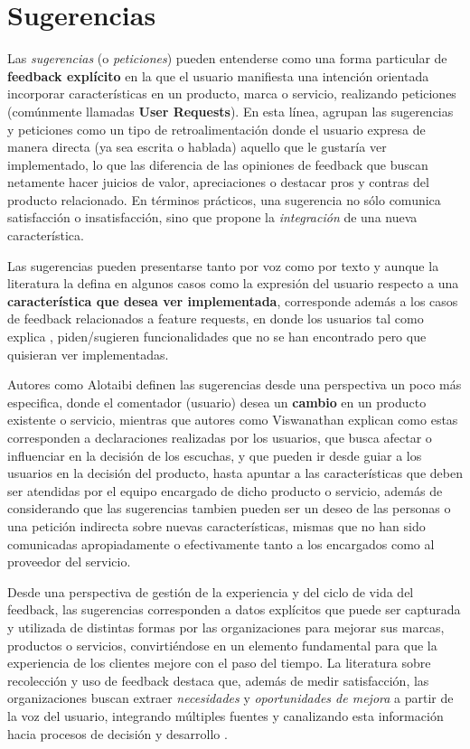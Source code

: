 \section{Sugerencias}
\label{sec:sugerencias}

Las \emph{sugerencias} (o \emph{peticiones}) pueden entenderse como una forma particular de \textbf{feedback explícito} en la que el usuario manifiesta una intención orientada incorporar características en un producto, marca o servicio, realizando peticiones (comúnmente llamadas \textbf{User Requests}). En esta línea, \textcite{tkalich2025user} agrupan las sugerencias y peticiones como un tipo de retroalimentación donde el usuario expresa de manera directa (ya sea escrita o hablada) aquello que le gustaría ver implementado, lo que las diferencia de las opiniones de feedback que buscan netamente hacer juicios de valor, apreciaciones o destacar pros y contras del producto relacionado. En términos prácticos, una sugerencia no sólo comunica satisfacción o insatisfacción, sino que propone la \emph{integración} de una nueva característica.

Las sugerencias pueden presentarse tanto por voz como por texto y aunque la literatura la defina en algunos casos como la expresión del usuario respecto a una \textbf{característica que desea ver implementada}, corresponde además a los casos de feedback relacionados a feature requests, en donde los usuarios tal como explica \textcite{maalej2016data}, piden/sugieren funcionalidades que no se han encontrado pero que quisieran ver implementadas.

Autores como Alotaibi \parencite{alotaibi2021suggestion} definen las sugerencias desde una perspectiva un poco más especifica, donde el comentador (usuario) desea un \textbf{cambio} en un producto existente o servicio, mientras que autores como Viswanathan \parencite{viswanathan2011suggestion} explican como estas corresponden a declaraciones realizadas por los usuarios, que busca afectar o influenciar en la decisión de los escuchas, y que pueden ir desde guiar a los usuarios en la decisión del producto, hasta apuntar a las características que deben ser atendidas por el equipo encargado de dicho producto o servicio, además de considerando que las sugerencias tambien pueden ser un deseo de las personas o una petición indirecta sobre nuevas características, mismas que no han sido comunicadas apropiadamente o efectivamente tanto a los encargados como al proveedor del servicio.

Desde una perspectiva de gestión de la experiencia y del ciclo de vida del feedback, las sugerencias corresponden a datos explícitos que puede ser capturada y utilizada de distintas formas por las organizaciones para mejorar sus marcas, productos o servicios, convirtiéndose en un elemento fundamental para que la experiencia de los clientes mejore con el paso del tiempo. La literatura sobre recolección y uso de feedback destaca que, además de medir satisfacción, las organizaciones buscan extraer \emph{necesidades} y \emph{oportunidades de mejora} a partir de la voz del usuario, integrando múltiples fuentes y canalizando esta información hacia procesos de decisión y desarrollo \parencite{Fabijan-Customer_Feedback_and_Data_Collection,tkalich2025user}.



